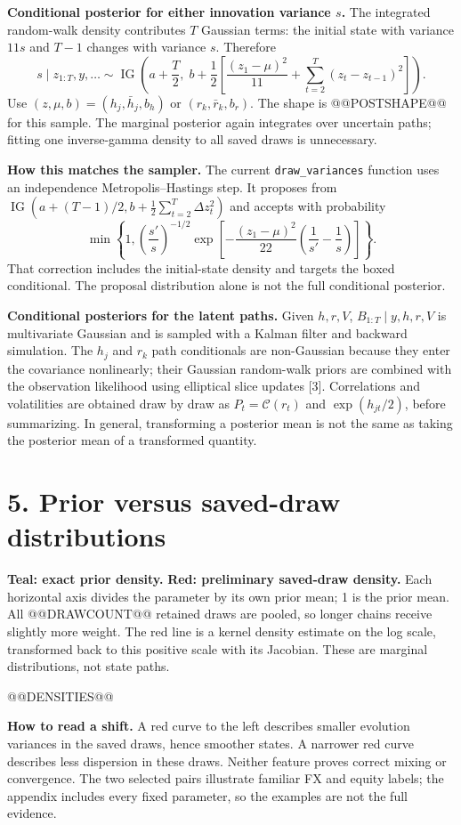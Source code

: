 \documentclass[10pt,a4paper]{article}
\newcommand{\IG}{\operatorname{IG}}
\begin{document}
\textbf{Conditional posterior for either innovation variance $s$.}
The integrated random-walk density contributes $T$ Gaussian terms: the initial state
with variance $11s$ and $T-1$ changes with variance $s$. Therefore
\[
\boxed{s\mid z_{1:T},y,\ldots\sim\IG\left(a+\frac T2,\;
b+\frac12\left[\frac{(z_1-\mu)^2}{11}+
\sum_{t=2}^T(z_t-z_{t-1})^2\right]\right).}
\]
Use $(z,\mu,b)=(h_j,\bar h_j,b_h)$ or $(r_k,\bar r_k,b_r)$.
The shape is @@POSTSHAPE@@ for this sample. The marginal posterior again integrates
over uncertain paths; fitting one inverse-gamma density to all saved draws is unnecessary.

\textbf{How this matches the sampler.} The current \texttt{draw\_variances} function uses
an independence Metropolis--Hastings step. It proposes from
$\IG(a+(T-1)/2,b+\tfrac12\sum_{t=2}^T\Delta z_t^2)$ and accepts with probability
\[
\min\left\{1,\left(\frac{s'}s\right)^{-1/2}
\exp\left[-\frac{(z_1-\mu)^2}{22}\left(\frac1{s'}-\frac1s\right)\right]\right\}.
\]
That correction includes the initial-state density and targets the boxed conditional.
The proposal distribution alone is not the full conditional posterior.

\textbf{Conditional posteriors for the latent paths.}
Given $h,r,V$, $B_{1:T}\mid y,h,r,V$ is multivariate Gaussian and is sampled with a
Kalman filter and backward simulation. The $h_j$ and $r_k$ path conditionals are
non-Gaussian because they enter the covariance nonlinearly; their Gaussian random-walk
priors are combined with the observation likelihood using elliptical slice updates [3].
Correlations and volatilities are obtained draw by draw as $P_t=\mathcal C(r_t)$ and
$\exp(h_{jt}/2)$, before summarizing. In general, transforming a posterior mean is not
the same as taking the posterior mean of a transformed quantity.

\clearpage
\section*{5. Prior versus saved-draw distributions}
\textcolor{prior}{\textbf{Teal: exact prior density.}}\quad
\textcolor{posterior}{\textbf{Red: preliminary saved-draw density.}}
Each horizontal axis divides the parameter by its own prior mean; 1 is the prior mean.
All @@DRAWCOUNT@@ retained draws are pooled, so longer chains receive slightly more weight.
The red line is a kernel density estimate on the log scale, transformed back to this
positive scale with its Jacobian. These are marginal distributions, not state paths.
\par\medskip
@@DENSITIES@@
\par\medskip
\textbf{How to read a shift.} A red curve to the left describes smaller evolution
variances in the saved draws, hence smoother states. A narrower red curve describes less
dispersion in these draws. Neither feature proves correct mixing or convergence.
The two selected pairs illustrate familiar FX and equity labels; the appendix includes
every fixed parameter, so the examples are not the full evidence.
\end{document}
